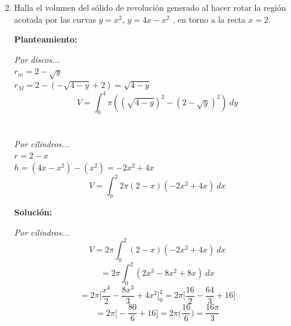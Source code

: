 \documentclass[10pt,letterpaper]{article}
\begin{document}
\begin{enumerate}
\begin{multicols}{2}
\end{multicols}


\item Halla el volumen del sólido de revolución generado al hacer rotar la región acotada por las
      curvas $y = x^2$, $y = 4x - x^2$ , en torno a la recta $x = 2$.

\begin{multicols}{2}


\textbf{Planteamiento:}

\textit{Por discos...} \\
$r_m = 2-\sqrt{y}$ \\
$r_M = 2-(-\sqrt{4-y} + 2) = \sqrt{4-y}$
$$V = \int_{0}^{4} \pi ( (\sqrt{4-y})^2 - (2-\sqrt{y})^2 ) \ dy$$\\\\

\textit{Por cilindros...} \\
$r = 2-x$ \\
$h = (4x-x^2)-(x^2) = -2x^2 + 4x$
$$V = \int_{0}^{2} 2\pi (2-x)(-2x^2+4x)\ dx$$

\textbf{Solución:}

\textit{Por cilindros...}
$$V = 2\pi \int_{0}^{2} (2-x)(-2x^2+4x)\ dx$$
$$= 2\pi \int_{0}^{2} (2x^3 - 8x^2 + 8x)\ dx$$
$$= 2\pi \bigg[ \frac{x^4}{2} - \frac{8x^3}{3} + 4x^2 \bigg]_{0}^{2}
= 2\pi \bigg[ \frac{16}{2} - \frac{64}{3} + 16 \bigg]$$
$$= 2\pi \bigg[ -\frac{80}{6} + 16 \bigg] = 2\pi \Big( \frac{16}{6} \Big)
= \frac{16\pi}{3}$$


\end{multicols}
\end{enumerate}
\end{document}
